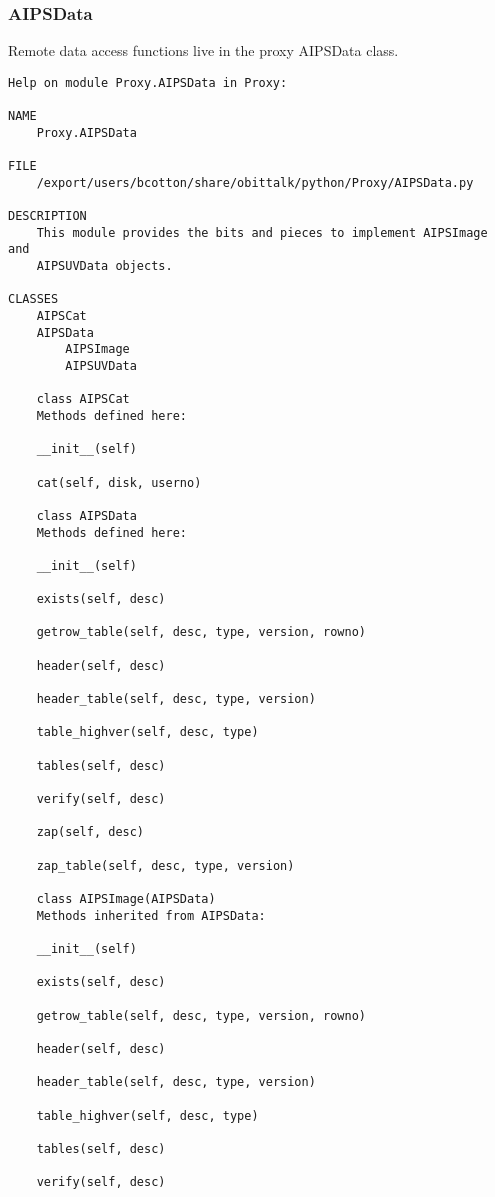 \documentclass[11pt]{report}
\begin{document}
\subsubsection{AIPSData}
Remote data access functions live in the proxy AIPSData class.
\begin{verbatim}
Help on module Proxy.AIPSData in Proxy:

NAME
    Proxy.AIPSData

FILE
    /export/users/bcotton/share/obittalk/python/Proxy/AIPSData.py

DESCRIPTION
    This module provides the bits and pieces to implement AIPSImage and
    AIPSUVData objects.

CLASSES
    AIPSCat
    AIPSData
        AIPSImage
        AIPSUVData
    
    class AIPSCat
    Methods defined here:
    
    __init__(self)
    
    cat(self, disk, userno)
    
    class AIPSData
    Methods defined here:
    
    __init__(self)
    
    exists(self, desc)
    
    getrow_table(self, desc, type, version, rowno)
    
    header(self, desc)
    
    header_table(self, desc, type, version)
    
    table_highver(self, desc, type)
    
    tables(self, desc)
    
    verify(self, desc)
    
    zap(self, desc)
    
    zap_table(self, desc, type, version)
    
    class AIPSImage(AIPSData)
    Methods inherited from AIPSData:
    
    __init__(self)
    
    exists(self, desc)
    
    getrow_table(self, desc, type, version, rowno)
    
    header(self, desc)
    
    header_table(self, desc, type, version)
    
    table_highver(self, desc, type)
    
    tables(self, desc)
    
    verify(self, desc)
    

\end{verbatim}
\end{document}
